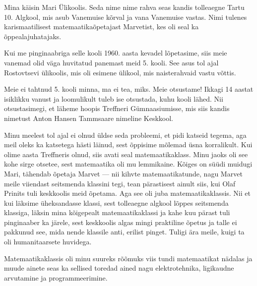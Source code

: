 

Mina käisin Mari Ülikoolis. Seda nime
nime rahva seas kandis tolleaegne Tartu 10. Algkool, mis asub Vanemuise 
kõrval ja vana Vanemuise vastas. Nimi tulenes karismaatilisest 
matemaatikaõpetajast Marvetist, kes oli seal ka õppealajuhatajaks.

Kui me pinginaabriga selle kooli 1960. aasta kevadel lõpetasime, siis 
meie vanemad olid väga huvitatud panemast meid 5. kooli. See asus tol ajal Rostovtsevi ülikoolis, mis oli esimene 
ülikool, mis naisterahvaid vastu võttis. 

Meie ei tahtnud 5. kooli minna, ma ei tea, miks. Meie otsustame! 
Ikkagi 14 aastat isiklikku vanust ja loomulikult tuleb ise otsustada, kuhu kooli 
lähed. Nii otsustasimegi, et läheme hoopis 
Treffneri Gümnaasiumisse, mis siis kandis 
nimetust Anton Hansen Tammsaare nimeline Keskkool. 

Minu meelest tol ajal ei 
olnud üldse seda probleemi, et pidi katseid tegema, aga 
meil oleks ka katsetega hästi läinud, sest õppisime mõlemad üsna 
korralikult. Kui olime aasta Treffneris olnud, siis avati seal 
matemaatikaklass. Minu jaoks oli see kohe sirge otsetee, sest
matemaatika oli mu lemmikaine. Kõiges on süüdi muidugi Mari, tähendab õpetaja 
Marvet --- nii kihvte matemaatikatunde, 
nagu Marvet meile viiendast seitsmenda klassini tegi, tean pärastisest ainult siis, 
kui Olaf Prinits tuli keskkoolis meid õpetama. Aga 
see oli juba matemaatikaklassis. Nii et kui läksime üheksandasse klassi, sest 
tolleaegne algkool lõppes seitsmenda klassiga, läksin mina kõigepealt matemaatikaklassi ja kahe kuu pärast tuli pinginaaber ka järele, sest 
keskkoolis algas mingi praktiline õpetus ja talle ei pakkunud see, mida nende 
klassile anti, erilist pinget. Tuligi ära meile, 
kuigi ta oli humanitaarsete huvidega. 

Matemaatikaklassis oli minu suureks rõõmuks viis tundi matemaatikat nädalas 
ja muude ainete seas ka sellised toredad ained nagu elektrotehnika, ligikaudne 
arvutamine ja programmeerimine. 



